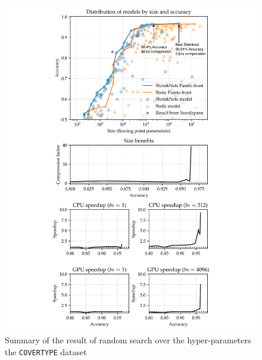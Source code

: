 \begin{figure}[t]
\begin{minipage}{2.7in}
\centering\includegraphics[width=\columnwidth]{COVER_FC_summary-arrows}
\vspace*{-10mm}
\caption{\label{figure_COVER} Summary of the result of random
search over the hyper-parameters the \texttt{COVERTYPE} dataset
}
\vspace*{-5mm}
\end{minipage}
\end{figure}


